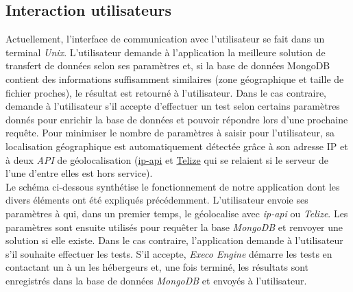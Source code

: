 \documentclass[10pt]{article}
\newcommand{\execoE}{\textit{Execo Engine}\xspace}
\begin{document}
\subsection{Interaction utilisateurs}

Actuellement, l'interface de communication avec l'utilisateur se fait dans un
terminal \textit{Unix}. L'utilisateur demande à l'application la meilleure
solution de transfert de données selon ses paramètres et, si la base de données
MongoDB contient des informations suffisamment similaires (zone géographique et
taille de fichier proches), le résultat est retourné à l'utilisateur. Dans le
cas contraire, \KYD demande à l'utilisateur s'il accepte d'effectuer un
test selon certains paramètres donnés pour enrichir la base de données et
pouvoir répondre lors d'une prochaine requête. Pour minimiser le nombre de
paramètres à saisir pour l'utilisateur, sa localisation géographique est
automatiquement détectée grâce à son adresse IP et à deux \textit{API} de
géolocalisation (\href{http://ip-api.com/docs/api:json}{ip-api} et
\href{http://www.telize.com/}{Telize} qui se relaient si le serveur de l'une
d'entre elles est hors service).\\

Le schéma ci-dessous synthétise le fonctionnement de notre application dont les
divers éléments ont été expliqués précédemment. L'utilisateur envoie ses
paramètres à \KYD qui, dans un premier temps, le géolocalise avec
\textit{ip-api} ou \textit{Telize}. Les paramètres sont ensuite utilisés pour
requêter la base \textit{MongoDB} et renvoyer une solution si elle existe. Dans
le cas contraire, l'application demande à l'utilisateur s'il souhaite effectuer
les tests. S'il accepte, \execoE démarre les tests en contactant un à un
les hébergeurs et, une fois terminé, les résultats sont enregistrés dans la
base de données \textit{MongoDB} et envoyés à l'utilisateur.
\end{document}
